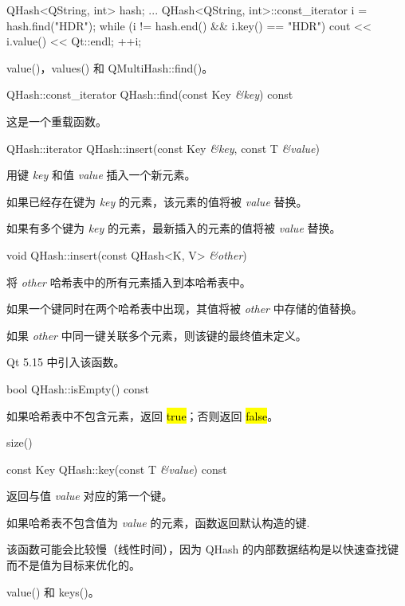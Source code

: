 \begin{cppcode}
QHash<QString, int> hash;
...
QHash<QString, int>::const_iterator i = hash.find("HDR");
while (i != hash.end() && i.key() == "HDR") {
    cout << i.value() << Qt::endl;
    ++i;
}
\end{cppcode}

\begin{seeAlso}
value()，values() 和 QMultiHash::find()。
\end{seeAlso}

QHash::const\_iterator QHash::find(const Key \emph{\&key}) const

这是一个重载函数。

QHash::iterator QHash::insert(const Key \emph{\&key}, const T \emph{\&value})

用键 \emph{key} 和值 \emph{value} 插入一个新元素。

如果已经存在键为 \emph{key} 的元素，该元素的值将被 \emph{value} 替换。

如果有多个键为 \emph{key} 的元素，最新插入的元素的值将被 \emph{value }替换。

void QHash::insert(const QHash<K, V> \emph{\&other})

将 \emph{other} 哈希表中的所有元素插入到本哈希表中。

如果一个键同时在两个哈希表中出现，其值将被 \emph{other} 中存储的值替换。

\begin{notice}
如果 \emph{other} 中同一键关联多个元素，则该键的最终值未定义。
\end{notice}

Qt 5.15 中引入该函数。

bool QHash::isEmpty() const

如果哈希表中不包含元素，返回 \hl{true}；否则返回 \hl{false}。

\begin{seeAlso}
size()
\end{seeAlso}

const Key QHash::key(const T \emph{\&value}) const

返回与值 \emph{value} 对应的第一个键。

如果哈希表不包含值为 \emph{value} 的元素，函数返回默认构造的键.

该函数可能会比较慢（线性时间），因为 QHash 的内部数据结构是以快速查找键而不是值为目标来优化的。

\begin{seeAlso}
value() 和 keys()。
\end{seeAlso}

